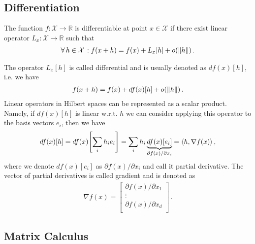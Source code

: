 \subsection{Differentiation}

\begin{mybox}
\begin{definition}\label{def:diff_function}
    The function $f: \mathcal{X} \to \mathbb{R}$ is differentiable at point $x \in \mathcal{X}$ if there exist linear operator $L_x: \mathcal{X} \to \mathbb{R}$ such that
    \begin{align}
        \forall\, h \in \mathcal{X}\,: f(x + h) = f(x) + L_x[h] + o(\norm{h})\,.
    \end{align}
\end{definition}    
\end{mybox}
The operator $L_x[h]$ is called differential and is usually denoted as $df(x)[h]$, i.e. we have
\begin{align}
    f(x + h) = f(x) + df(x)[h] + o(\norm{h})\,.
\end{align}
Linear operators in Hilbert spaces can be represented as a scalar product. Namely, if $df(x)[h]$ is linear w.r.t. $h$ we can consider applying this operator to the basis vectors $e_i$, then we have
\begin{align}
    df(x)[h] = df(x)\left[\sum_i h_i e_i\right] = \sum_i h_i \underbrace{df(x)\left[e_i\right]}_{\partial f(x)/ \partial x_i} = \inner{h}{\nabla f(x)}\,,
\end{align}
where we denote $df(x)\left[e_i\right]$ as $\partial f(x)/ \partial x_i$ and call it partial derivative.
The vector of partial derivatives is called gradient and is denoted as
\begin{align}
    \nabla f(x) = \begin{bmatrix}
        \partial f(x)/ \partial x_1\\
        \vdots\\
        \partial f(x)/ \partial x_d\\
    \end{bmatrix}\,.
\end{align}


\subsection{Matrix Calculus}

